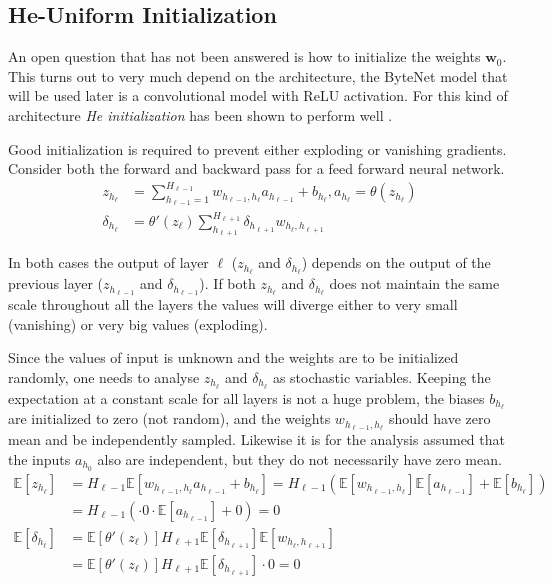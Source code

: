 \subsection{He-Uniform Initialization}

An open question that has not been answered is how to initialize the weights $\mathbf{w}_0$. This turns out to very much depend on the architecture, the ByteNet model that will be used later is a convolutional model with ReLU activation. For this kind of architecture \textit{He initialization} has been shown to perform well \cite{he-initialization}. 

Good initialization is required to prevent either exploding or vanishing gradients. Consider both the forward and backward pass for a feed forward neural network.
\begin{equation}
\begin{aligned}
z_{h_\ell} &= \sum_{h_{\ell-1} = 1}^{H_{\ell-1}} w_{h_{\ell-1}, h_{\ell}} a_{h_{\ell-1}} + b_{h_{\ell}}, a_{h_\ell} = \theta(z_{h_\ell}) \\
\delta_{h_\ell} &= \theta'(z_\ell) \sum_{h_{\ell+1}}^{H_{\ell+1}} \delta_{h_{\ell+1}} w_{h_\ell, h_{\ell+1}}
\end{aligned}
\end{equation}

In both cases the output of layer $\ell$ ($z_{h_\ell}$ and $\delta_{h_\ell}$) depends on the output of the previous layer ($z_{h_{\ell-1}}$ and $\delta_{h_{\ell-1}}$). If both $z_{h_\ell}$ and $\delta_{h_\ell}$ does not maintain the same scale throughout all the layers the values will diverge either to very small (vanishing) or very big values (exploding).

Since the values of input is unknown and the weights are to be initialized randomly, one needs to analyse $z_{h_\ell}$ and $\delta_{h_\ell}$ as stochastic variables. Keeping the expectation at a constant scale for all layers is not a huge problem, the biases $b_{h_\ell}$ are initialized to zero (not random), and the weights $w_{h_{\ell-1}, h_\ell}$ should have zero mean and be independently sampled. Likewise it is for the analysis assumed that the inputs $a_{h_0}$ also are independent, but they do not necessarily have zero mean.
\begin{equation}
\begin{aligned}
\mathbb{E}[z_{h_\ell}]
&= H_{\ell-1} \mathbb{E}[w_{h_{\ell-1}, h_{\ell}} a_{h_{\ell-1}} + b_{h_\ell}] = H_{\ell-1} \left(\mathbb{E}[w_{h_{\ell-1}, h_{\ell}}] \mathbb{E}[a_{h_{\ell-1}}] + \mathbb{E}[b_{h_\ell}]\right) \\
&= H_{\ell-1}\left(\cdot 0 \cdot \mathbb{E}[a_{h_{\ell-1}}] + 0\right) = 0 \\
\mathbb{E}[\delta_{h_\ell}] &= \mathbb{E}[\theta'(z_\ell)] H_{\ell + 1} \mathbb{E}[\delta_{h_{\ell+1}}] \mathbb{E}[w_{h_\ell, h_{\ell+1}}] \\
&= \mathbb{E}[\theta'(z_\ell)] H_{\ell + 1} \mathbb{E}[\delta_{h_{\ell+1}}] \cdot 0 = 0
\end{aligned}
\end{equation}

